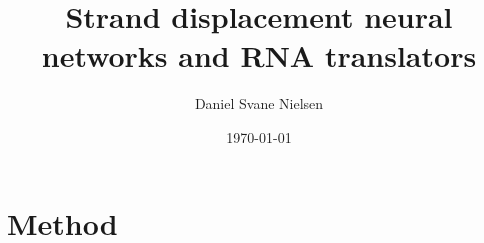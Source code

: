 \documentclass{report}
\title{Strand displacement neural networks and RNA translators}
\author{Daniel Svane Nielsen}
\date{\today}
\begin{document}
  \maketitle

  \chapter{Method}
  
\end{document}
